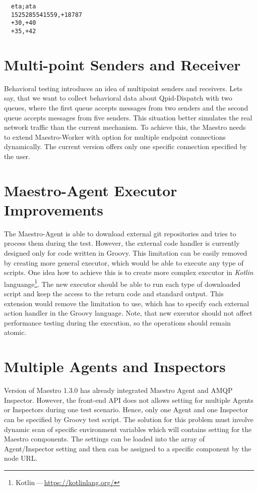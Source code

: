\begin{verbatim}
  eta;ata
  1525285541559,+18787
  +30,+40
  +35,+42
\end{verbatim}

\section{Multi-point Senders and Receiver}
Behavioral testing introduces an idea of multipoint senders and receivers. Lets say, that we want to collect behavioral data about Qpid-Dispatch with two queues, where the first queue accepts messages from two senders and the second queue accepts messages from five senders. This situation better simulates the real network traffic than the current mechanism. To achieve this, the Maestro needs to extend Maestro-Worker with option for multiple endpoint connections dynamically. The current version offers only one specific connection specified by the user.

\section{Maestro-Agent Executor Improvements}
The Maestro-Agent is able to download external git repositories and tries to process them during the test. However, the external code handler is currently designed only for code written in Groovy. This limitation can be easily removed by creating more general executor, which would be able to execute any type of scripts. One idea how to achieve this is to create more complex executor in \emph{Kotlin} languange\footnote{Kotlin\,---\,\url{https://kotlinlang.org/}}. The new executor should be able to run each type of downloaded script and keep the access to the return code and standard output. This extension would remove the limitation to use, which has to specify each external action handler in the Groovy language. Note, that new executor should not affect performance testing during the execution, so the operations should remain atomic.

\section{Multiple Agents and Inspectors}
Version of Maestro 1.3.0 has already integrated Maestro Agent and AMQP Inspector. However, the front-end API does not allows setting for multiple Agents or Inspectors during one test scenario. Hence, only one Agent and one Inspector can be specified by Groovy test script. The solution for this problem must involve dynamic scan of specific environment variables which will contains setting for the Maestro components. The settings can be loaded into the array of Agent/Inspector setting and then can be assigned to a specific component by the node URL.


